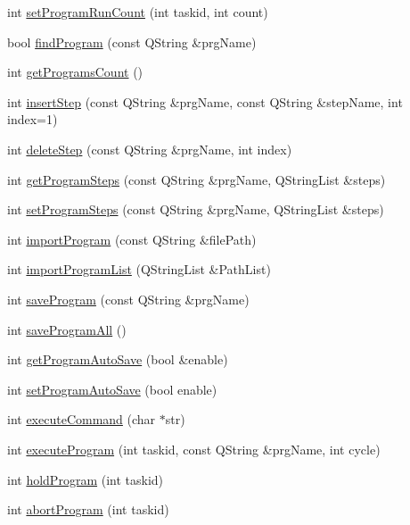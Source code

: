 \begin{DoxyCompactItemize}
\item 
int \hyperlink{classCNRobo_a6fd21b7370c72b83e4796e4545f40819}{set\-Program\-Run\-Count} (int taskid, int count)
\item 
bool \hyperlink{classCNRobo_acb479c0d364abc672e92ccb013651861}{find\-Program} (const Q\-String \&prg\-Name)
\item 
int \hyperlink{classCNRobo_a05bf761c9de3cf89bb5ff9bdd29fb0d7}{get\-Programs\-Count} ()
\item 
int \hyperlink{classCNRobo_a55467fdaec5bd01b86dbbbba2b9a585d}{insert\-Step} (const Q\-String \&prg\-Name, const Q\-String \&step\-Name, int index=1)
\item 
int \hyperlink{classCNRobo_a22560b7dd6a3a64cc60cdcbaafaeaf8b}{delete\-Step} (const Q\-String \&prg\-Name, int index)
\item 
int \hyperlink{classCNRobo_a3ce0cb44eb4042767003595a17131114}{get\-Program\-Steps} (const Q\-String \&prg\-Name, Q\-String\-List \&steps)
\item 
int \hyperlink{classCNRobo_ab1af057ff951026397576c8a8c98bb2d}{set\-Program\-Steps} (const Q\-String \&prg\-Name, Q\-String\-List \&steps)
\item 
int \hyperlink{classCNRobo_a6bd631f2c15c7f6603d338c4898968dc}{import\-Program} (const Q\-String \&file\-Path)
\item 
int \hyperlink{classCNRobo_a673a595729d21d4702163f44ecd4c224}{import\-Program\-List} (Q\-String\-List \&Path\-List)
\item 
int \hyperlink{classCNRobo_a6200b639b549dece69539bab822da298}{save\-Program} (const Q\-String \&prg\-Name)
\item 
int \hyperlink{classCNRobo_a538a3167d8ca6281e83abf56a49de72e}{save\-Program\-All} ()
\item 
int \hyperlink{classCNRobo_a9306712a13e906fd97b00dde248689bf}{get\-Program\-Auto\-Save} (bool \&enable)
\item 
int \hyperlink{classCNRobo_a95ec29fcd97b70af98f466cfc787f002}{set\-Program\-Auto\-Save} (bool enable)
\item 
int \hyperlink{classCNRobo_a24a8cbfb3afe8934a68643928853ab22}{execute\-Command} (char $\ast$str)
\item 
int \hyperlink{classCNRobo_a58fea660f386b22f9dcbc0dddfcd5a6e}{execute\-Program} (int taskid, const Q\-String \&prg\-Name, int cycle)
\item 
int \hyperlink{classCNRobo_a4cf6153ace10090eec1dfb7886f98b7e}{hold\-Program} (int taskid)
\item 
int \hyperlink{classCNRobo_af4752ead4ac3532853b4ef312c6fa327}{abort\-Program} (int taskid)

\end{DoxyCompactItemize}
